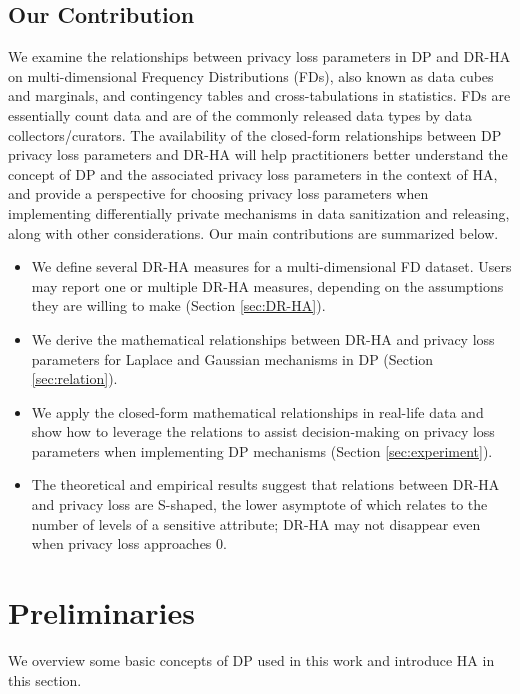 \documentclass[10pt,journal,compsoc]{IEEEtran}
\begin{document}
\subsection{Our Contribution}\vspace{-3pt}
We examine the relationships between privacy loss parameters in DP and DR-HA on multi-dimensional Frequency Distributions (FDs), also known as data cubes and marginals, and  contingency tables and cross-tabulations in statistics. FDs are essentially count data and are of the commonly released data types by data collectors/curators. The availability of the closed-form relationships between DP privacy loss parameters and DR-HA will help practitioners better understand the concept of DP and the associated privacy loss parameters in the context of HA, and  provide a perspective for choosing privacy loss parameters when implementing differentially private mechanisms in data sanitization and releasing, along with other considerations. 
Our main contributions are summarized below. 
\vspace{-2pt}
\begin{itemize}[leftmargin=12pt, itemsep=-3pt]
\item We define several DR-HA measures for a multi-dimensional FD dataset. Users may report one or multiple DR-HA measures, depending on the assumptions they are willing to make (Section \ref{sec:DR-HA}).
\item We derive the mathematical relationships between DR-HA and privacy loss parameters for Laplace and Gaussian mechanisms in DP (Section \ref{sec:relation}).
\item We apply the closed-form mathematical relationships in real-life data and show how to leverage the relations to assist decision-making on privacy loss parameters when implementing DP mechanisms (Section \ref{sec:experiment}).
\item The theoretical and empirical results suggest that relations between DR-HA and privacy loss are S-shaped, the lower asymptote of which relates to the number of levels of a sensitive attribute; DR-HA may not disappear even when privacy loss approaches 0.
\end{itemize}


\vspace{-9pt}
\section{Preliminaries}\label{sec:prelim}\vspace{-3pt}
We overview some basic concepts of DP used in this work and introduce  HA in this section.
\end{document}
